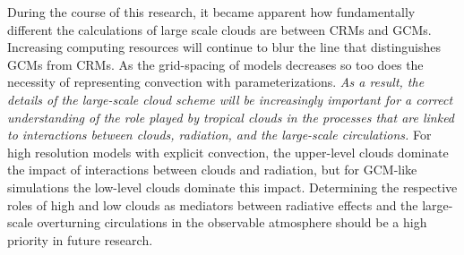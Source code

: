 \documentclass[draft]{agujournal2019}
\begin{document}
{%

% 

During the course of this research, it became apparent how fundamentally different the calculations of large scale clouds are between CRMs and GCMs.
Increasing computing resources will continue to blur the line that distinguishes GCMs from CRMs. 
As the grid-spacing of models decreases so too does the necessity of representing convection with parameterizations. 
\textit{As a result, the details of the large-scale cloud scheme will be increasingly important for a correct 
understanding of the role played by tropical clouds in the processes that are linked to interactions between clouds,
radiation, and the large-scale circulations.}  
For high resolution models with explicit convection, the upper-level clouds dominate the impact of interactions between 
clouds and radiation, but for GCM-like simulations the low-level clouds dominate this impact.  
Determining the respective roles of high and low clouds as mediators between radiative effects and the large-scale overturning 
circulations in the observable atmosphere should be a high priority in future research.     

}
\end{document}
